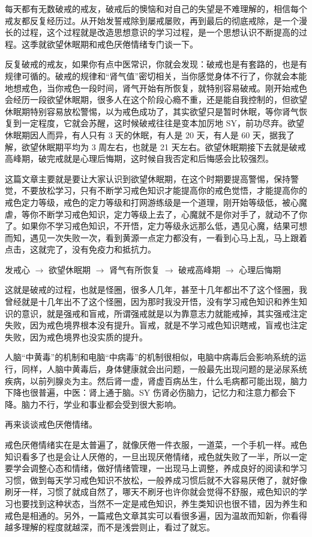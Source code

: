 \documentclass{ctexart}
\begin{document}
每天都有无数破戒的戒友，破戒后的懊恼和对自己的失望是不难理解的，相信每个戒友都反复经历过。从开始发誓戒除到屡戒屡败，再到最后的彻底戒除，是一个漫长的过程，这个过程就是改造思想意识的学习过程，是一个思想认识不断提高的过程。这季就欲望休眠期和戒色厌倦情绪专门谈一下。

反复破戒的戒友，如果你有点中医常识，你就会发现：破戒也是有套路的，也是有规律可循的。破戒的规律和“肾气值”密切相关，当你感觉身体不行了，你就会本能地想戒色，当你戒色一段时间，肾气开始有所恢复，就特别容易破戒。刚开始戒色会经历一段欲望休眠期，很多人在这个阶段心瘾不重，还是能自我控制的，但欲望休眠期特别容易放松警惕，以为戒色成功了，其实欲望只是暂时休眠，等你肾气恢复到一定程度，它就会苏醒，这时候破戒往往是变本加厉地 SY，前功尽弃。欲望休眠期因人而异，有人只有 3 天的休眠，有人是 20 天，有人是 60 天，据我了解，欲望休眠期平均为 3 周左右，也就是 21 天左右。欲望休眠期接下去就是破戒高峰期，破完戒就是心理后悔期，这时候自我否定和后悔感会比较强烈。

这篇文章主要就是要让大家认识到欲望休眠期，在这个时期要提高警惕，保持警觉，不要放松学习，只有不断学习戒色知识才能提高你的戒色觉悟，才能提高你的戒色定力等级，戒色的定力等级和打网游练级是一个道理，刚开始等级低，被心魔虐，等你不断学习戒色知识，定力等级上去了，心魔就不是你对手了，就动不了你了。如果你不学习戒色知识，不开悟，定力等级永远那么低，遇见心魔，结果可想而知，遇见一次失败一次，看到黄源一点定力都没有，一看到心马上乱，马上跟着点击，这就完了，没有免疫力和抵抗力。

\begin{center}
    发戒心 $\to$ 欲望休眠期 $\to$ 肾气有所恢复 $\to$ 破戒高峰期 $\to$ 心理后悔期
\end{center}

这就是破戒的过程，也就是怪圈，很多人几年，甚至十几年都出不了这个怪圈，我曾经就是十几年出不了这个怪圈，因为那时我没开悟，没有学习戒色知识和养生知识的意识，就是强戒和盲戒，所谓强戒就是以为靠意志力就能戒掉，其实强戒注定失败，因为戒色境界根本没有提升。盲戒，就是不学习戒色知识瞎戒，盲戒也注定失败，因为戒色境界也没实质的提升。

人脑“中黄毒”的机制和电脑“中病毒”的机制很相似，电脑中病毒后会影响系统的运行，同样，人脑中黄毒后，身体健康就会出问题，一般最先出现问题的是泌尿系统疾病，以前列腺炎为主。然后肾一虚，肾虚百病丛生，什么毛病都可能出现，脑力下降也很普遍，中医：肾上通于脑。SY 伤肾必伤脑力，记忆力和注意力都会下降。脑力不行，学业和事业都会受到很大影响。

再来谈谈戒色厌倦情绪。

戒色厌倦情绪实在是太普遍了，就像厌倦一件衣服，一道菜，一个手机一样。戒色知识看多了也是会让人厌倦的，一旦出现厌倦情绪，戒色就失败了一半，所以一定要学会调整心态和情绪，做好情绪管理，一出现马上调整，养成良好的阅读和学习习惯，做到每天学习戒色知识不放松，一般养成习惯后就不大容易厌倦了，就好像刷牙一样，习惯了就成自然了，哪天不刷牙也许你就会觉得不舒服，戒色知识的学习也要找到这种状态，当然不一定是戒色知识，养生类知识也很不错，因为养生和戒色是相通的。另外，一篇戒色文章其实可以看很多遍，因为温故而知新，你看得越多理解的程度就越深，而不是浅尝则止，看过了就忘。
\end{document}
